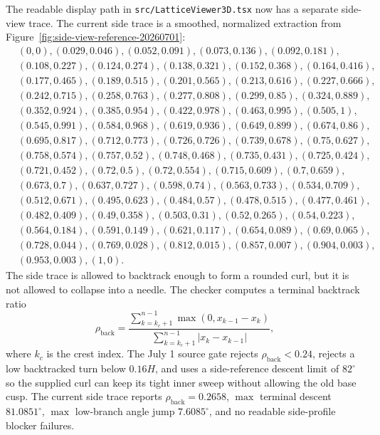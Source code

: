 \documentclass[12pt,letterpaper]{article}
\newcommand{\pathcode}[1]{\nolinkurl{#1}}
\begin{document}
The readable display path in \pathcode{src/LatticeViewer3D.tsx} now has a separate side-view trace. The current side trace is a smoothed, normalized extraction from Figure~\ref{fig:side-view-reference-20260701}:
\[
\begin{split}
&(0,0),(0.029,0.046),(0.052,0.091),(0.073,0.136),(0.092,0.181),\\
&(0.108,0.227),(0.124,0.274),(0.138,0.321),(0.152,0.368),(0.164,0.416),\\
&(0.177,0.465),(0.189,0.515),(0.201,0.565),(0.213,0.616),(0.227,0.666),\\
&(0.242,0.715),(0.258,0.763),(0.277,0.808),(0.299,0.85),(0.324,0.889),\\
&(0.352,0.924),(0.385,0.954),(0.422,0.978),(0.463,0.995),(0.505,1),\\
&(0.545,0.991),(0.584,0.968),(0.619,0.936),(0.649,0.899),(0.674,0.86),\\
&(0.695,0.817),(0.712,0.773),(0.726,0.726),(0.739,0.678),(0.75,0.627),\\
&(0.758,0.574),(0.757,0.52),(0.748,0.468),(0.735,0.431),(0.725,0.424),\\
&(0.721,0.452),(0.72,0.5),(0.72,0.554),(0.715,0.609),(0.7,0.659),\\
&(0.673,0.7),(0.637,0.727),(0.598,0.74),(0.563,0.733),(0.534,0.709),\\
&(0.512,0.671),(0.495,0.623),(0.484,0.57),(0.478,0.515),(0.477,0.461),\\
&(0.482,0.409),(0.49,0.358),(0.503,0.31),(0.52,0.265),(0.54,0.223),\\
&(0.564,0.184),(0.591,0.149),(0.621,0.117),(0.654,0.089),(0.69,0.065),\\
&(0.728,0.044),(0.769,0.028),(0.812,0.015),(0.857,0.007),(0.904,0.003),\\
&(0.953,0.003),(1,0).
\end{split}
\]
The side trace is allowed to backtrack enough to form a rounded curl, but it is not allowed to collapse into a needle. The checker computes a terminal backtrack ratio
\[
  \rho_{\mathrm{back}}=
  \frac{\sum_{k=k_c+1}^{n-1}\max(0,x_{k-1}-x_k)}
       {\sum_{k=k_c+1}^{n-1}|x_k-x_{k-1}|},
\]
where \(k_c\) is the crest index. The July 1 source gate rejects \(\rho_{\mathrm{back}}<0.24\), rejects a low backtracked turn below \(0.16H\), and uses a side-reference descent limit of \(82^\circ\) so the supplied curl can keep its tight inner sweep without allowing the old base cusp. The current side trace reports \(\rho_{\mathrm{back}}=0.2658\), \(\max\) terminal descent \(81.0851^\circ\), \(\max\) low-branch angle jump \(7.6085^\circ\), and no readable side-profile blocker failures.
\end{document}
